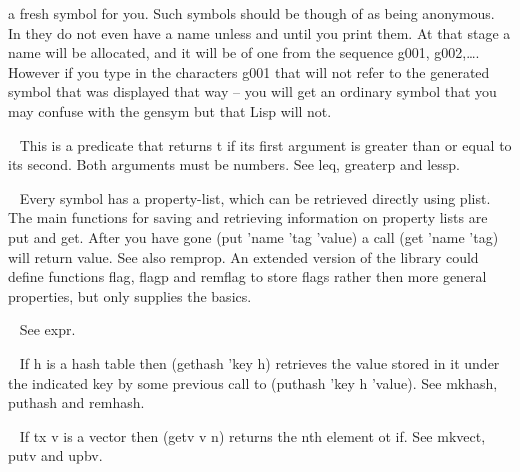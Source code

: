 \begin{description}
a fresh symbol for you. Such symbols should be though of as being anonymous.
In \vsl{} they do not even have a name unless and until you print them. At
that stage a name will be allocated, and it will be of one from the
sequence {\tx g001}, {\tx g002},\ldots. However if you type in the characters
{\tx g001} that will not refer to the generated symbol that was displayed
that way -- you will get an ordinary symbol that you may confuse with the
gensym but that Lisp will not.
\item[{\tx geq~~~~~~~~~~} \hspace{1cm} {\em function 2 args}]~\newline
This is a predicate that returns {\tx t} if its first argument is
greater than or equal to its second. Both arguments must be numbers. See
{\tx leq}, {\tx greaterp} and {\tx lessp}.
\item[{\tx get~~~~~~~~~~} \hspace{1cm} {\em function 2 args}]~\newline
Every symbol has a property-list, which can be retrieved directly using
{\tx plist}. The main functions for saving and retrieving information
on property lists are {\tx put} and {\tx get}. After you have gone
{\tx (put 'name 'tag 'value)} a call {\tx (get 'name 'tag)} will return {\tx
value}. See also {\tx remprop}. An extended version of the library could define
functions {\tx flag}, {\tx flagp} and {\tx remflag} to store flags rather
then more general properties, but \vsl{} only supplies the basics.
\item[{\tx getd~~~~~~~~~} \hspace{1cm} {\em function 1 arg}]~\newline
See {\tx expr}.
\item[{\tx gethash~~~~~~} \hspace{1cm} {\em function 2 args}]~\newline
If {\tx h} is a hash table then {\tx (gethash 'key h)} retrieves the value
stored in it under the indicated {\tx key} by some previous call to
{\tx (puthash 'key h 'value)}. See {\tx mkhash}, {\tx puthash} and {\tx remhash}.
\item[{\tx getv~~~~~~~~~} \hspace{1cm} {\em function 2 args}]~\newline
If {tx v} is a vector then {\tx (getv v n)} returns the {\tx n}th element
ot if. See {\tx mkvect}, {\tx putv} and {\tx upbv}.
\item[{\tx go~~~~~~~~~~~} \hspace{1cm} {\em special form}]~\newline

\end{description}
